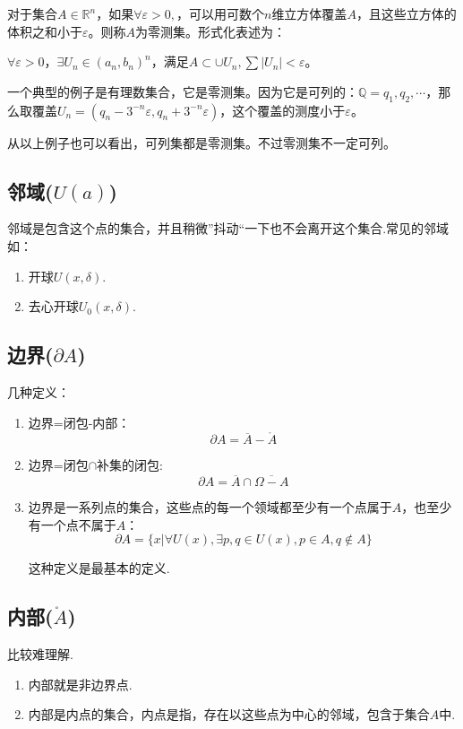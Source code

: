 \begin{definition}[零测集]
对于集合$A\in\mathbb{R}^n$，如果$\forall \varepsilon>0,$，可以用可数个$n$维立方体覆盖$A$，且这些立方体的体积之和小于$\varepsilon$。则称$A$为零测集。形式化表述为：

$\forall \varepsilon>0，\exists U_n\in(a_n, b_n)^n$，满足$A\subset \cup U_n, \sum |U_n|<\varepsilon$。
\end{definition}

一个典型的例子是有理数集合，它是零测集。因为它是可列的：$\mathbb{Q}={q_1,q_2,\cdots}$，那么取覆盖$U_n=(q_n-3^{-n}\varepsilon,q_n+3^{-n}\varepsilon)$，这个覆盖的测度小于$\varepsilon$。

从以上例子也可以看出，可列集都是零测集。不过零测集不一定可列。
\subsection{邻域($U(a)$)}邻域是包含这个点的集合，并且稍微”抖动“一下也不会离开这个集合.常见的邻域如：

\begin{enumerate}
	\item 开球$U(x,\delta)$.
	\item 去心开球$U_0(x,\delta)$.
\end{enumerate}

\subsection{边界($\partial A$)}几种定义：

\begin{enumerate}
\item 边界=闭包-内部：
	$$\partial A=\overline{A}-\mathring{A}$$
\item 边界=闭包$\cap$补集的闭包:
	$$\partial A=\overline{A}\cap \overline{\Omega-A}$$
\item 边界是一系列点的集合，这些点的每一个领域都至少有一个点属于$A$，也至少有一个点不属于$A$：
	$$\partial A=\{x | \forall U(x), \exists p,q\in U(x), p\in A, q\notin A\}$$
	
	这种定义是最基本的定义.
\end{enumerate}

\subsection{内部($\mathring{A}$)}比较难理解.

\begin{enumerate}
	\item 内部就是非边界点.
	\item 内部是内点的集合，内点是指，存在以这些点为中心的邻域，包含于集合$A$中.
\end{enumerate}

